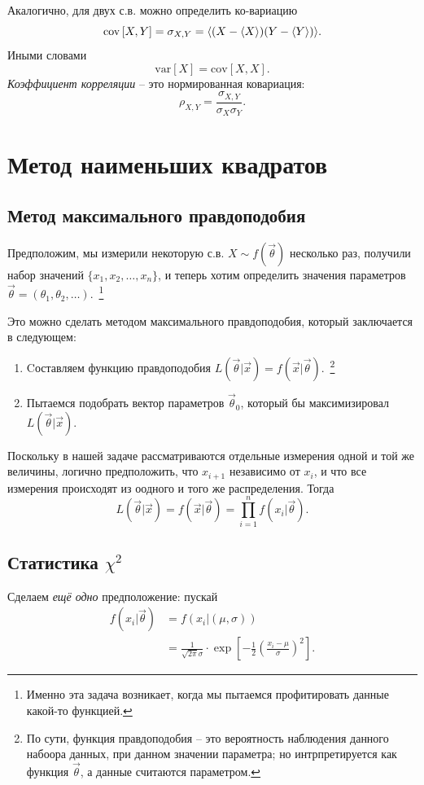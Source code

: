 \documentclass{report}
\newcommand{\var}[1]{\mathrm{var}\left[{#1}\right]}
\newcommand{\cov}[1]{\mathrm{cov}\left[{#1}\right]}
\begin{document}
Акалогично, для двух с.в. можно определить ко-вариацию
\[
\cov{X, Y} = \sigma_{X,Y} = \avg{(X-\avg{X})(Y-\avg{Y})}.
\]
Иными словами
\[
\var{X} = \cov{X,X}.
\]
\emph{Коэффициент корреляции} -- это нормированная ковариация:
\[
\rho_{X,Y} = \frac{\sigma_{X,Y}}{\sigma_X\sigma_Y}.
\]
\section{Метод наименьших квадратов}
\subsection{Метод максимального правдоподобия}
Предположим, мы измерили некоторую с.в. $X\sim f(\vec \theta)$ несколько раз, получили набор значений $\{x_1, x_2,\dots,x_n\}$, и теперь хотим определить значения параметров $\vec\theta = (\theta_1, \theta_2, \dots)$.~\footnote{Именно эта задача возникает, когда мы пытаемся профитировать данные какой-то функцией.}

Это можно сделать методом максимального правдоподобия, который заключается в следующем:
\begin{enumerate}
	\item Cоставляем функцию правдоподобия $L(\vec\theta|\vec x) = f(\vec x|\vec\theta)$.~\footnote{По сути, функция правдоподобия -- это вероятность наблюдения данного набоора данных, при данном значении параметра; но интрпретируется как функция $\vec\theta$, а данные считаются параметром.}
	\item  Пытаемся подобрать вектор параметров $\vec\theta_0$, который бы максимизировал $L(\vec\theta|\vec x)$.
\end{enumerate}

\begin{rmk}
	Поскольку в нашей задаче рассматриваются отдельные измерения одной и той же величины, логично предположить, что $x_{i+1}$ независимо от $x_i$, и что все измерения происходят из оодного и того же распределения. Тогда 
	\[
	L(\vec\theta|\vec x) = f(\vec x|\vec\theta) = \prod_{i=1}^n f(x_i|\vec\theta).
	\]
\end{rmk}

\subsection{Статистика $\chi^2$}
Сделаем \emph{ещё одно} предположение: пускай 
\begin{align*}
f(x_i|\vec\theta) &= f(x_i|(\mu,\sigma)) \\
&= \frac{1}{\sqrt{2\pi}\sigma}\cdot \exp\left[-\frac12\left(\frac{x_i-\mu}{\sigma}\right)^2\right].
\end{align*}
\end{document}
